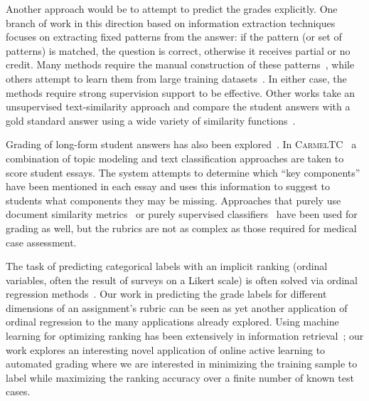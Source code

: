 Another approach would be to attempt to predict the grades explicitly. One
branch of work in this direction based on information extraction techniques
focuses on extracting fixed patterns from the answer: if the pattern (or
set of patterns) is matched, the question is correct, otherwise it receives
partial or no credit. Many methods require the manual construction of these
patterns~\cite{Mitchell:2002:ICAA, Leacock:2003:CatH}, while others attempt to
learn them from large training datasets~\cite{Pulman:2005:EdAppsNLP}. In either
case, the methods require strong supervision support to be effective.  Other
works take an unsupervised text-similarity approach and compare the student
answers with a gold standard answer using a wide variety of similarity
functions~\cite{Mohler:2009:EACL}.

Grading of long-form student answers has also been
explored~\cite{Balfour:2013}. In
\textsc{CarmelTC}~\cite{Rose:2003:HLT-NAACL-EDUC} a combination of topic
modeling and text classification approaches are taken to score student
essays. The system attempts to determine which ``key components'' have been
mentioned in each essay and uses this information to suggest to students
what components they may be missing. Approaches that purely use document
similarity metrics~\cite{Duwairi:2006:CHB} or purely supervised
classifiers~\cite{Larkey:1998:SIGIR} have been used for grading as well,
but the rubrics are not as complex as those required for medical case
assessment.

The task of predicting categorical labels with an implicit ranking (ordinal
variables, often the result of surveys on a Likert scale) is often solved
via ordinal regression methods~\cite{McCullagh:1980}. Our work in
predicting the grade labels for different dimensions of an assignment's
rubric can be seen as yet another application of ordinal regression to the
many applications already explored. Using machine learning for optimizing
ranking has been extensively in information retrieval~\cite{Manning:2008}; our
work explores an interesting novel application of online active learning to
automated grading where we are interested in minimizing the training sample
to label while maximizing the ranking accuracy over a finite number of
known test cases.
